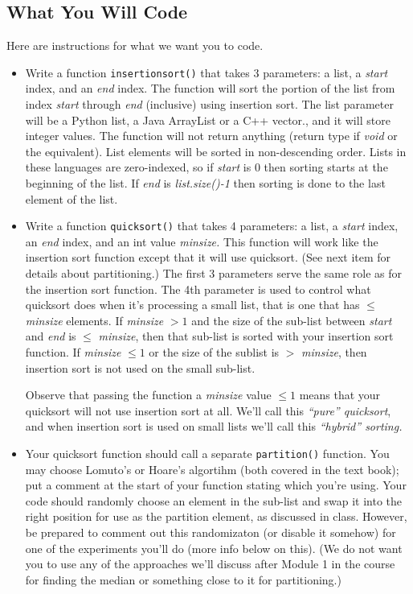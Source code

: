 \documentclass[11pt]{article}
\begin{document}
\subsection*{What You Will Code}
Here are instructions for what we want you to code.
\begin{itemize}

	\item Write a function {\tt insertionsort()} that takes 3 parameters: a list, a {\em start\/} index, and an {\em end\/} index. The function will sort the portion of the list from index {\em start\/} through {\em end\/} (inclusive) using insertion sort. The list parameter will be a Python list, a Java ArrayList or a C++ vector., and it will store integer values. The function will not return anything (return type if {\em void\/} or the equivalent). List elements will be sorted in non-descending order. Lists in these languages are zero-indexed, so if {\em start\/} is 0 then sorting starts at the beginning of the list.  If {\em end\/} is {\em{list.size()-1}} then sorting is done to the last element of the list.

	\item Write a function {\tt quicksort()} that takes 4 parameters: a list, a {\em start\/} index, an {\em end\/} index, and an int value {\em minsize.}  This function will work like the insertion sort function except that it will use quicksort. (See next item for details about partitioning.) The first 3 parameters serve the same role as for the insertion sort function. The 4th parameter is used to control what quicksort does when it's processing a small list, that is one that has $\leq$ {\em minsize} elements.  If {\em minsize} $> 1$ and the size of the sub-list between {\em start\/} and {\em end\/} is $\leq$ {\em minsize}, then that sub-list is sorted with your insertion sort function.  If {\em minsize} $\leq 1$ or the size of the sublist is $>$ {\em minsize}, then insertion sort is not used on the small sub-list. 
	
	Observe that passing the function a {\em minsize} value $\leq 1$ means that your quicksort will not use insertion sort at all.  We'll call this {\em ``pure'' quicksort\/}, and when insertion sort is used on small lists we'll call this {\em ``hybrid'' sorting.}
	
	\item Your quicksort function should call a separate {\tt partition()} function. You may choose Lomuto's or Hoare's algortihm (both covered in the text book); put a comment at the start of your function stating which you're using.  Your code should randomly choose an element in the sub-list and swap it into the right position for use as the partition element, as discussed in class.  However, be prepared to comment out this randomizaton (or disable it somehow) for one of the experiments you'll do (more info below on this).  (We do not want you to use any of the approaches we'll discuss after Module 1 in the course for finding the median or something close to it for partitioning.)


\end{itemize}
\end{document}
